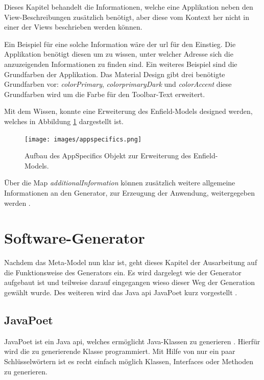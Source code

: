 Dieses Kapitel behandelt die Informationen, welche eine Applikation neben den View-Beschreibungen zusätzlich benötigt, aber diese vom Kontext her nicht in einer der Views beschrieben werden können.

Ein Beispiel für eine solche Information wäre der \acf{url} für den Einstieg. Die Applikation benötigt diesen um zu wissen, unter welcher Adresse sich die anzuzeigenden Informationen zu finden sind. Ein weiteres Beispiel sind die Grundfarben der Applikation. Das Material Design gibt drei benötigte Grundfarben vor: \textit{colorPrimary}, \textit{colorprimaryDark} und \textit{colorAccent} diese Grundfarben wird um die Farbe für den Toolbar-Text erweitert.

Mit dem Wissen, konnte eine Erweiterung des Enfield-Models designed werden, welches in Abbildung \ref{fig:appspecifics} dargestellt ist.

\begin{figure}[H]
	\begin{center}
		\texttt{[image: images/appspecifics.png]}
		\caption{Aufbau des AppSpecifics Objekt  zur Erweiterung des Enfield-Models.}
		\label{fig:appspecifics}
	\end{center}
\end{figure}

 Über die Map \textit{additionalInformation} können zusätzlich weitere allgemeine Informationen an den Generator, zur Erzeugung der Anwendung, weitergegeben werden .

\section{Software-Generator}

Nachdem das Meta-Model nun klar ist, geht dieses Kapitel der Ausarbeitung auf die Funktionsweise des Generators ein. 
Es wird dargelegt wie der Generator aufgebaut ist und teilweise darauf eingegangen wieso dieser Weg der Generation gewählt wurde. Des weiteren wird das Java \acf{api} JavaPoet kurz vorgestellt \cite{poet}.

\subsection{JavaPoet}
JavaPoet ist ein Java \ac{api}, welches ermöglicht Java-Klassen zu generieren \cite{poet}. Hierfür wird die zu generierende Klasse programmiert. Mit Hilfe von nur ein paar Schlüsselwörtern ist es recht einfach möglich Klassen, Interfaces oder Methoden zu generieren. 

